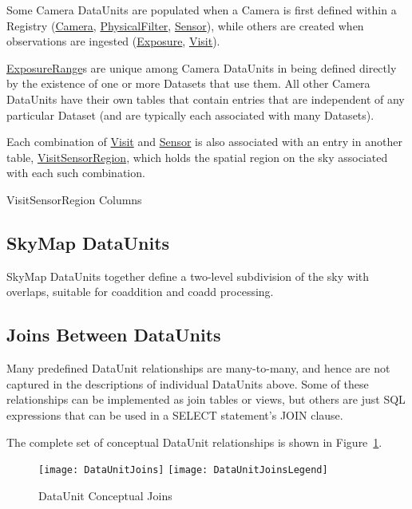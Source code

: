 \documentclass[DM,toc]{lsstdoc}
\newcommand{\tblref}[1]{\hyperref[tbl:#1]{#1}}
\newcommand{\unitref}[1]{\hyperref[unit:#1]{#1}}
\newcommand{\coltable}[1]{
    \begin{table}[htb]
        {
            \footnotesize
            
        }
        \caption{#1 Columns}
        \label{tbl:#1}
    \end{table}
}
\newcommand{\unitinc}[1]{}
\begin{document}
Some Camera DataUnits are populated when a Camera is first defined within a Registry (\unitref{Camera}, \unitref{PhysicalFilter}, \unitref{Sensor}), while others are created when observations are ingested (\unitref{Exposure}, \unitref{Visit}).

\unitref{ExposureRange}s are unique among Camera DataUnits in being defined directly by the existence of one or more Datasets that use them.
All other Camera DataUnits have their own tables that contain entries that are independent of any particular Dataset (and are typically each associated with many Datasets).

Each combination of \unitref{Visit} and \unitref{Sensor} is also associated with an entry in another table, \tblref{VisitSensorRegion}, which holds the spatial region on the sky associated with each such combination.

\unitinc{Camera}
\unitinc{PhysicalFilter}
\unitinc{Sensor}
\unitinc{Exposure}
\unitinc{Visit}
\coltable{VisitSensorRegion}
\unitinc{ExposureRange}

\subsection{SkyMap DataUnits}
\label{sec:skymap-dataunits}

SkyMap DataUnits together define a two-level subdivision of the sky with overlaps, suitable for coaddition and coadd processing.

\unitinc{SkyMap}
\unitinc{Tract}
\unitinc{Patch}

\subsection{Joins Between DataUnits}
\label{sec:joins-between-dataunits}

Many predefined DataUnit relationships are many-to-many, and hence are not captured in the descriptions of individual DataUnits above.
Some of these relationships can be implemented as join tables or views, but others are just SQL expressions that can be used in a SELECT statement's JOIN clause.

The complete set of conceptual DataUnit relationships is shown in Figure~\ref{fig:DataUnitJoins}.

\begin{figure}
    \centering
    \texttt{[image: DataUnitJoins]}
    \texttt{[image: DataUnitJoinsLegend]}
    \caption{DataUnit Conceptual Joins}
    \label{fig:DataUnitJoins}
\end{figure}
\end{document}
